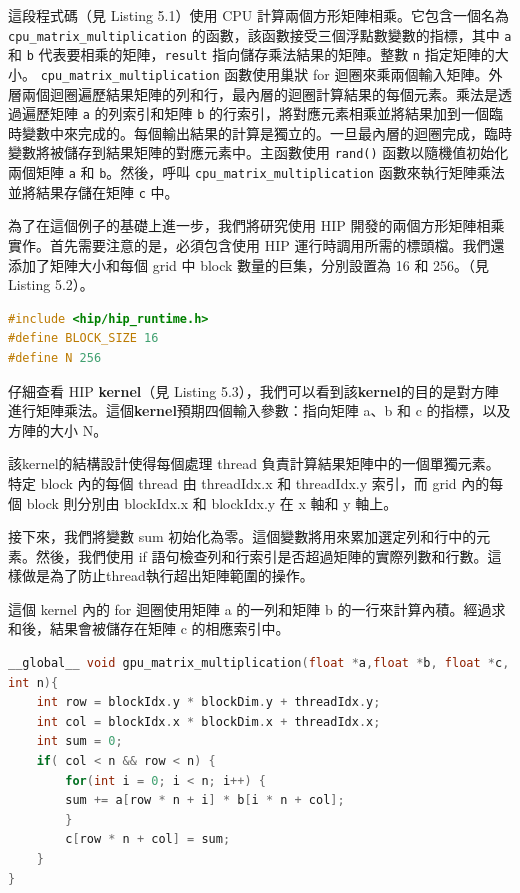 這段程式碼（見 Listing 5.1）使用 CPU 計算兩個方形矩陣相乘。它包含一個名為 \texttt{cpu\_matrix\_multiplication} 的函數，該函數接受三個浮點數變數的指標，其中 \texttt{a} 和 \texttt{b} 代表要相乘的矩陣，\texttt{result} 指向儲存乘法結果的矩陣。整數 \texttt{n} 指定矩陣的大小。 \texttt{cpu\_matrix\_multiplication} 函數使用巢狀 for 迴圈來乘兩個輸入矩陣。外層兩個迴圈遍歷結果矩陣的列和行，最內層的迴圈計算結果的每個元素。乘法是透過遍歷矩陣 \texttt{a} 的列索引和矩陣 \texttt{b} 的行索引，將對應元素相乘並將結果加到一個臨時變數中來完成的。每個輸出結果的計算是獨立的。一旦最內層的迴圈完成，臨時變數將被儲存到結果矩陣的對應元素中。主函數使用 \texttt{rand()} 函數以隨機值初始化兩個矩陣 \texttt{a} 和 \texttt{b}。然後，呼叫 \texttt{cpu\_matrix\_multiplication} 函數來執行矩陣乘法並將結果存儲在矩陣 \texttt{c} 中。



為了在這個例子的基礎上進一步，我們將研究使用 HIP 開發的兩個方形矩陣相乘實作。首先需要注意的是，必須包含使用 HIP 運行時調用所需的標頭檔。我們還添加了矩陣大小和每個 grid 中 block 數量的巨集，分別設置為 16 和 256。（見 Listing 5.2）。

\lstset{style=mystyle}
\begin{lstlisting}[language=c++,caption={標頭檔和巨集}]
#include <hip∕hip_runtime.h>
#define BLOCK_SIZE 16
#define N 256
\end{lstlisting}


仔細查看 HIP \textbf{kernel}（見 Listing 5.3），我們可以看到該\textbf{kernel}的目的是對方陣進行矩陣乘法。這個\textbf{kernel}預期四個輸入參數：指向矩陣 a、b 和 c 的指標，以及方陣的大小 N。


該kernel的結構設計使得每個處理 thread 負責計算結果矩陣中的一個單獨元素。特定 block 內的每個 thread 由 threadIdx.x 和 threadIdx.y 索引，而 grid 內的每個 block 則分別由 blockIdx.x 和 blockIdx.y 在 x 軸和 y 軸上。


接下來，我們將變數 sum 初始化為零。這個變數將用來累加選定列和行中的元素。然後，我們使用 if 語句檢查列和行索引是否超過矩陣的實際列數和行數。這樣做是為了防止thread執行超出矩陣範圍的操作。


這個 kernel 內的 for 迴圈使用矩陣 a 的一列和矩陣 b 的一行來計算內積。經過求和後，結果會被儲存在矩陣 c 的相應索引中。

\lstset{style=mystyle}
\begin{lstlisting}[language=c++,caption={GPU程式碼}]
__global__ void gpu_matrix_multiplication(float *a,float *b, float *c,
int n){
    int row = blockIdx.y * blockDim.y + threadIdx.y;
    int col = blockIdx.x * blockDim.x + threadIdx.x;
    int sum = 0;
    if( col < n && row < n) {
        for(int i = 0; i < n; i++) {
        sum += a[row * n + i] * b[i * n + col];
        }
        c[row * n + col] = sum;
    }
}
\end{lstlisting}


